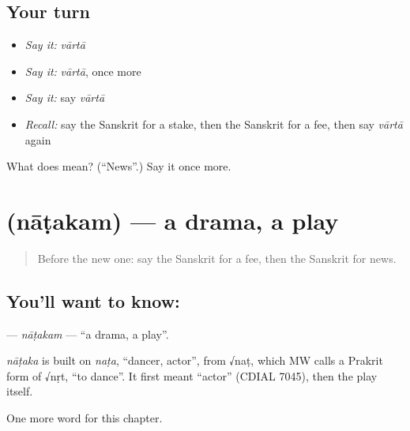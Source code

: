 \subsection*{Your turn}
\begin{itemize}
\raggedright
  \item \emph{Say it:} \emph{vārtā}
  \item \emph{Say it:} \emph{vārtā}, once more
  \item \emph{Say it:} say \emph{vārtā}
  \item \emph{Recall:} say the Sanskrit for a stake, then the Sanskrit for a fee, then say \emph{vārtā} again
\end{itemize}

\begin{tcolorbox}[breakable,colback=teal!4,colframe=teal!35!black,title={Before you move on}]
What does  mean? (\textquotedblleft{}News\textquotedblright{}.) Say it once more.
\end{tcolorbox}
\section[\texorpdfstring{\sk{नाटकम्} (nāṭakam)}{नाटकम् (nāṭakam)}]{ (nāṭakam) — a drama, a play}

\label{lesson:SA-C249-natakam}



\begin{quote}
Before the new one: say the Sanskrit for a fee, then the Sanskrit for news.
\end{quote}

\subsection*{You'll want to know: }
\textbf{} — \emph{nāṭakam} — \textquotedblleft{}a drama, a play\textquotedblright{}.

\begin{cousinweb}
\emph{nāṭaka} is built on \emph{naṭa}, \textquotedblleft{}dancer, actor\textquotedblright{}, from √naṭ, which MW calls a Prakrit form of √nṛt, \textquotedblleft{}to dance\textquotedblright{}. It first meant \textquotedblleft{}actor\textquotedblright{} (CDIAL 7045), then the play itself.
\end{cousinweb}

\begin{grammarlens}[title={What you've built}]
One more word for this chapter.
\end{grammarlens}

